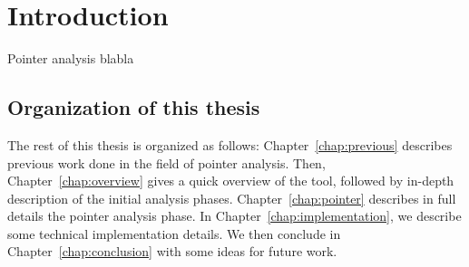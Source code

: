 \chapter{Introduction} \label{chap:intro}
Pointer analysis blabla

\section{Organization of this thesis}
The rest of this thesis is organized as follows:
Chapter~\ref{chap:previous} describes previous work done in the field of pointer analysis.
Then, Chapter~\ref{chap:overview} gives a quick overview of the tool, followed by in-depth description of the initial analysis phases.
Chapter~\ref{chap:pointer} describes in full details the pointer analysis phase.
In Chapter~\ref{chap:implementation}, we describe some technical implementation
details. We then conclude in Chapter~\ref{chap:conclusion} with some ideas for
future work.

